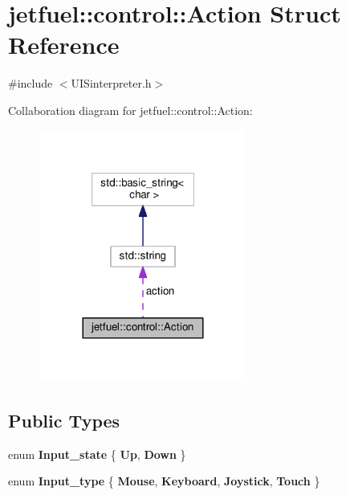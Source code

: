 \hypertarget{structjetfuel_1_1control_1_1Action}{}\section{jetfuel\+:\+:control\+:\+:Action Struct Reference}
\label{structjetfuel_1_1control_1_1Action}


{\ttfamily \#include $<$U\+I\+Sinterpreter.\+h$>$}



Collaboration diagram for jetfuel\+:\+:control\+:\+:Action\+:
\nopagebreak
\begin{figure}[H]
\begin{center}
\leavevmode
\includegraphics[width=192pt]{structjetfuel_1_1control_1_1Action__coll__graph}
\end{center}
\end{figure}
\subsection*{Public Types}
\begin{DoxyCompactItemize}
\item 
\mbox{\label{structjetfuel_1_1control_1_1Action_a619ce738704c0ff88688056437e8743a}} 
enum {\bfseries Input\+\_\+state} \{ {\bfseries Up}, 
{\bfseries Down}
 \}
\item 
\mbox{\label{structjetfuel_1_1control_1_1Action_a52c78bcd5d7251daa99fa97487356a75}} 
enum {\bfseries Input\+\_\+type} \{ {\bfseries Mouse}, 
{\bfseries Keyboard}, 
{\bfseries Joystick}, 
{\bfseries Touch}
 \}
\end{DoxyCompactItemize}
